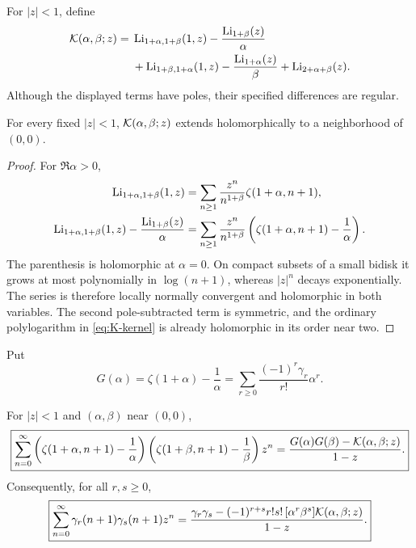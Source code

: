 For $|z|<1$, define
\begin{align}
 \mathcal{K}(\alpha,\beta;z)={}&
 \operatorname{Li}_{1+\alpha,1+\beta}(1,z)
       -\frac{\operatorname{Li}_{1+\beta}(z)}{\alpha}
 \notag\\
 &+\operatorname{Li}_{1+\beta,1+\alpha}(1,z)
       -\frac{\operatorname{Li}_{1+\alpha}(z)}{\beta}
 +\operatorname{Li}_{2+\alpha+\beta}(z).
 \label{eq:K-kernel}
\end{align}
Although the displayed terms have poles, their specified differences
are regular.

\begin{lemma}
\label{lem:K-holomorphic}
For every fixed $|z|<1$, $\mathcal{K}(\alpha,\beta;z)$ extends holomorphically
to a neighborhood of $(0,0)$.
\end{lemma}

\begin{proof}
For $\Re\alpha>0$,
\begin{align*}
 \operatorname{Li}_{1+\alpha,1+\beta}(1,z)
 &=\sum_{n\ge1}\frac{z^n}{n^{1+\beta}}
   \zeta(1+\alpha,n+1),\\
 \operatorname{Li}_{1+\alpha,1+\beta}(1,z)
 -\frac{\operatorname{Li}_{1+\beta}(z)}{\alpha}
 &=\sum_{n\ge1}\frac{z^n}{n^{1+\beta}}
 \left(\zeta(1+\alpha,n+1)-\frac1\alpha\right).
\end{align*}
The parenthesis is holomorphic at $\alpha=0$.  On compact subsets of a
small bidisk it grows at most polynomially in $\log(n+1)$, whereas
$|z|^n$ decays exponentially.  The series is therefore locally
normally convergent and holomorphic in both variables.  The second
pole-subtracted term is symmetric, and the ordinary polylogarithm in
\eqref{eq:K-kernel} is already holomorphic in its order near two.
\end{proof}

Put
\begin{equation}
 G(\alpha)=\zeta(1+\alpha)-\frac1\alpha
 =\sum_{r\ge0}\frac{(-1)^r\gamma_r}{r!}\alpha^r.
 \label{eq:G-alpha}
\end{equation}

\begin{theorem}
\label{thm:stieltjes-correlation-generator}
For $|z|<1$ and $(\alpha,\beta)$ near $(0,0)$,
\begin{equation}
 \boxed{\displaystyle
 \sum_{n=0}^{\infty}
 \left(\zeta(1+\alpha,n+1)-\frac1\alpha\right)
 \left(\zeta(1+\beta,n+1)-\frac1\beta\right)z^n
 =\frac{G(\alpha)G(\beta)-\mathcal{K}(\alpha,\beta;z)}{1-z}.}
 \label{eq:parameter-correlation}
\end{equation}
Consequently, for all $r,s\ge0$,
\begin{equation}
 \boxed{\displaystyle
 \sum_{n=0}^{\infty}\gamma_r(n+1)\gamma_s(n+1)z^n
 =\frac{\gamma_r\gamma_s
 -(-1)^{r+s}r!s!\,[\alpha^r\beta^s]
       \mathcal{K}(\alpha,\beta;z)}{1-z}.}
 \label{eq:stieltjes-correlation}
\end{equation}
\end{theorem}

